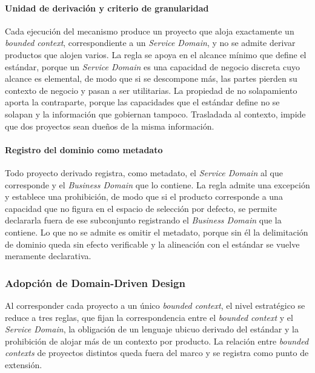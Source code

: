 \paragraph*{Unidad de derivación y criterio de granularidad}

Cada ejecución del mecanismo produce un proyecto que aloja exactamente un
\emph{bounded context}, correspondiente a un \emph{Service Domain}, y no se
admite derivar productos que alojen varios. La regla se apoya en el alcance
mínimo que define el estándar, porque un \emph{Service Domain} es una
capacidad de negocio discreta cuyo alcance es elemental, de modo que si se
descompone más, las partes pierden su contexto de negocio y pasan a ser
utilitarias. La propiedad de no solapamiento aporta la contraparte, porque
las capacidades que el estándar define no se solapan y la información que
gobiernan tampoco. Trasladada al contexto, impide que dos proyectos sean
dueños de la misma información.

\paragraph*{Registro del dominio como metadato}

Todo proyecto derivado registra, como metadato, el \emph{Service Domain} al
que corresponde y el \emph{Business Domain} que lo contiene. La regla admite
una excepción y establece una prohibición, de modo que si el producto
corresponde a una capacidad que no figura en el espacio de selección por
defecto, se permite declararla fuera de ese subconjunto registrando el
\emph{Business Domain} que la contiene. Lo que no se admite es omitir el
metadato, porque sin él la delimitación de dominio queda sin efecto
verificable y la alineación con el estándar se vuelve meramente declarativa.

\subsubsection*{Adopción de Domain-Driven Design}

Al corresponder cada proyecto a un único \emph{bounded context}, el nivel
estratégico se reduce a tres reglas, que fijan la correspondencia entre el
\emph{bounded context} y el \emph{Service Domain}, la obligación de un
lenguaje ubicuo derivado del estándar y la prohibición de alojar más de un
contexto por producto. La relación entre \emph{bounded contexts} de proyectos
distintos queda fuera del marco y se registra como punto de extensión.

